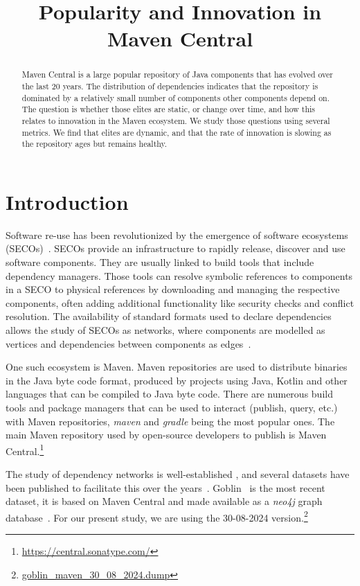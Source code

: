 \documentclass[10pt,conference]{IEEEtran}
\title{Popularity and Innovation in Maven Central}
\author{\IEEEauthorblockN{Nkiru Ede, Jens Dietrich, and Ulrich
Z\"ulicke}
\IEEEauthorblockA{\{nkiru.ede,jens.dietrich,uli.zuelicke\}@vuw.ac.nz\\
Victoria University of Wellington \\
Wellington, New Zealand}}
\begin{document}
\maketitle

\begin{abstract}  
Maven Central is a large popular repository of Java components
that has evolved over the last 20 years. The distribution of
dependencies indicates that the repository is dominated by a
relatively small number of components other components depend
on. The question is whether those elites are static, or change
over time, and how this relates to innovation in the Maven
ecosystem. We study those questions using several metrics. We
find that elites are dynamic, and that the rate of innovation
is slowing as the repository ages but remains healthy. 
\end{abstract}

\section{Introduction}
\label{section:introduction}

Software re-use has been revolutionized by the emergence of
software ecosystems (SECOs)~\cite{mens2023seco}. SECOs provide
an infrastructure to rapidly release, discover and use software
components. They are usually linked to build tools that include
dependency managers. Those tools can resolve symbolic references to
components in a SECO to physical references by downloading and
managing the respective components, often adding additional
functionality like security checks and conflict resolution. The
availability of standard formats used to declare dependencies
allows the study of SECOs as networks, where components are
modelled as vertices and dependencies between components as
edges~\cite{Valverde2002,Myers2003,Zheng2008,Cataldo2014}.

One such ecosystem is Maven. Maven repositories are used to
distribute binaries in the Java byte code format, produced by 
projects using Java, Kotlin and other languages that can be
compiled to Java byte code. There are numerous build tools and package
managers that can be used to interact (publish, query, etc.)
with Maven repositories,  \textit{maven} and \textit{gradle}
being the most popular ones. The main Maven repository used by
open-source developers to publish is Maven
Central.\footnote{\url{https://central.sonatype.com/}}

The study of dependency networks is well-established
\cite{decan2019empirical,fritz2024rustNetwork}, and several
datasets have been published to facilitate this over the
years~\cite{raemaekers2013maven,benelallam2019maven,
jaime2024goblin}. Goblin~\cite{jaime2024goblin} is the most
recent dataset, it is based on Maven Central and made available as a \textit{neo4j} graph
database~\cite{jaime2025challenge}. For our present study, we are using the 30-08-2024
version.\footnote{\href{https://zenodo.org/records/13683940}{goblin\_maven\_30\_08\_2024.dump}}
\end{document}
